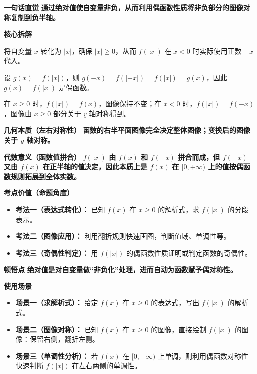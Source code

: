 \begin{explanationbox}
	\textbf{\textcolor{CExplanation}{一句话直觉}}
	\textbf{通过绝对值使自变量非负，从而利用偶函数性质将非负部分的图像对称复制到负半轴。}

	\medskip
	\textbf{\textcolor{CExplanation}{核心拆解}}
	\begin{description}[style=nextline, leftmargin=2.8em, labelsep=0.5em, itemsep=0.45em]
		\item[\textbf{要点一（绝对值作用）：}]
			将自变量 $x$ 转化为 $|x|$，确保 $|x|\ge 0$，从而 $f(|x|)$ 在 $x<0$ 时实际使用正数 $-x$ 代入。
		\item[\textbf{要点二（偶函数判定）：}]
			设 $g(x)=f(|x|)$，则 $g(-x)=f(|-x|)=f(|x|)=g(x)$，因此 $g(x)=f(|x|)$ 是偶函数。
		\item[\textbf{要点三（图像生成规则）：}]
			在 $x\ge 0$ 时，$f(|x|)=f(x)$，图像保持不变；在 $x<0$ 时，$f(|x|)=f(-x)$，图像由 $x\ge 0$ 部分关于 $y$ 轴对称得到。
	\end{description}

	\medskip
	\textbf{\textcolor{CExplanation}{几何本质（左右对称性）}}
	\textbf{函数的右半平面图像完全决定整体图像；变换后的图像关于 $y$ 轴对称。}

	\medskip
	\textbf{\textcolor{CExplanation}{代数意义（函数值拼合）}}
	\textbf{$f(|x|)$ 由 $f(x)$ 和 $f(-x)$ 拼合而成，但 $f(-x)$ 又由 $f(x)$ 在正半轴的值决定，因此本质上是 $f(x)$ 在 $[0,+\infty)$ 上的值按偶函数规则拓展到全体实数。}

	\medskip
	\textbf{\textcolor{CExplanation}{考点价值（命题角度）}}
	\begin{itemize}[leftmargin=*, itemsep=0.5em, topsep=0.4em]
		\item \textbf{考法一（表达式转化）：} 已知 $f(x)$ 在 $x\ge 0$ 的解析式，求 $f(|x|)$ 的分段表示。
		\item \textbf{考法二（图像应用）：} 利用翻折规则快速画图，判断值域、单调性等。
		\item \textbf{考法三（奇偶性判定）：} 用 $f(|x|)$ 的偶函数性质证明或判定函数的奇偶性。
	\end{itemize}

	\medskip
	\textbf{\textcolor{CExplanation}{顿悟点}}
	\textbf{绝对值是对自变量做“非负化”处理，进而自动为函数赋予偶对称性。}

	\medskip
	\textbf{\textcolor{CExplanation}{使用场景}}
	\begin{itemize}[leftmargin=*, itemsep=0.5em, topsep=0.4em]
		\item \textbf{场景一（求解析式）：} 给定 $f(x)$ 在 $x\ge 0$ 的表达式，写出 $f(|x|)$ 的解析式。
		\item \textbf{场景二（图像对称）：} 已知 $f(x)$ 在 $x\ge 0$ 的图像，直接绘制 $f(|x|)$ 的图像：保留右侧，翻折左侧。
		\item \textbf{场景三（单调性分析）：} 若 $f(x)$ 在 $[0,+\infty)$ 上单调，则利用偶函数对称性快速判断 $f(|x|)$ 在左右两侧的单调性。
	\end{itemize}
\end{explanationbox}